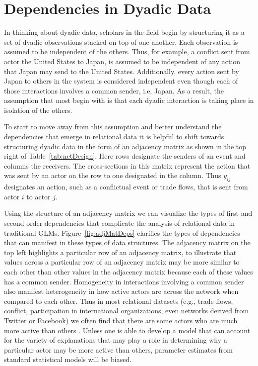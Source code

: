 \section{\textbf{Dependencies in Dyadic Data}}

In thinking about dyadic data, scholars in the field begin by structuring it as a set of dyadic observations stacked on top of one another. Each observation is assumed to be independent of the others. Thus, for example, a conflict sent from actor the United States to Japan, is assumed to be independent of any action that Japan may send to the United States. Additionally, every action sent by Japan to others in the system is considered independent even though each of those interactions involves a common sender, i.e, Japan. As a result, the assumption that most begin with is that each dyadic interaction is taking place in isolation of the others. 


\FloatBarrier

To start to move away from this assumption and better understand the dependencies that emerge in relational data it is helpful to shift towards structuring dyadic data in the form of an adjacency matrix as shown in the top right of Table~\ref{tab:netDesign}. Here rows designate the senders of an event and columns the receivers. The cross-sections in this matrix represent the action that was sent by an actor on the row to one designated in the column. Thus $y_{ij}$ designates an action, such as a conflictual event or trade flows, that is sent from actor $i$ to actor $j$. 

Using the structure of an adjacency matrix we can visualize the types of first and second order dependencies that complicate the analysis of relational data in traditional GLMs. Figure~\ref{fig:adjMatDeps} clarifies the types of dependencies that can manifest in these types of data structures. The adjacency matrix on the top left highlights a particular row of an adjacency matrix, to illustrate that values across a particular row of an adjacency matrix may be more similar to each other than other values in the adjacency matrix because each of these values has a common sender. Homogeneity in interactions involving a common sender also manifest heterogeneity in how active actors are across the network when compared to each other. Thus in most relational datasets (e.g., trade flows, conflict, participation in international organizations, even networks derived from Twitter or Facebook) we often find that there are some actors who are much more active than others \citep{barabasi:reka:1999}. Unless one is able to develop a model that can account for the variety of explanations that may play a role in determining why a particular actor may be more active than others, parameter estimates from standard statistical models will be biased.

